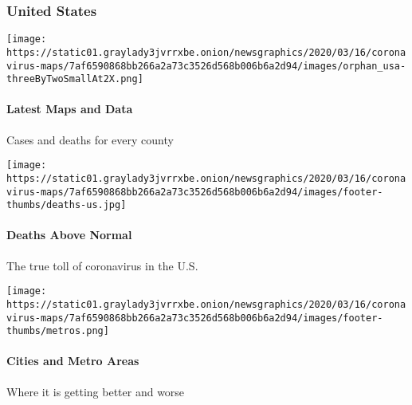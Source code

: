 \hypertarget{united-states}{%
\subsubsection{United States}\label{united-states}}

\href{https://www.nytimes3xbfgragh.onion/interactive/2020/us/coronavirus-us-cases.html}{}

\texttt{[image: https://static01.graylady3jvrrxbe.onion/newsgraphics/2020/03/16/coronavirus-maps/7af6590868bb266a2a73c3526d568b006b6a2d94/images/orphan\_usa-threeByTwoSmallAt2X.png]}

\hypertarget{latest-maps-and-data}{%
\paragraph{Latest Maps and Data}\label{latest-maps-and-data}}

Cases and deaths for every county

\href{https://www.nytimes3xbfgragh.onion/interactive/2020/05/05/us/coronavirus-death-toll-us.html}{}

\texttt{[image: https://static01.graylady3jvrrxbe.onion/newsgraphics/2020/03/16/coronavirus-maps/7af6590868bb266a2a73c3526d568b006b6a2d94/images/footer-thumbs/deaths-us.jpg]}

\hypertarget{deaths-above-normal}{%
\paragraph{Deaths Above Normal}\label{deaths-above-normal}}

The true toll of coronavirus in the U.S.

\href{https://www.nytimes3xbfgragh.onion/interactive/2020/04/23/upshot/five-ways-to-monitor-coronavirus-outbreak-us.html}{}

\texttt{[image: https://static01.graylady3jvrrxbe.onion/newsgraphics/2020/03/16/coronavirus-maps/7af6590868bb266a2a73c3526d568b006b6a2d94/images/footer-thumbs/metros.png]}

\hypertarget{cities-and-metro-areas}{%
\paragraph{Cities and Metro Areas}\label{cities-and-metro-areas}}

Where it is getting better and worse

\href{https://www.nytimes3xbfgragh.onion/interactive/2020/us/coronavirus-testing.html}{}

